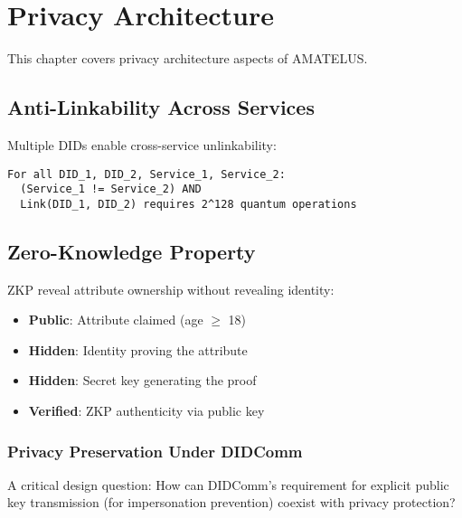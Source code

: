\chapter{Privacy Architecture}


\begin{definition}
  \label{def:priv-chapter}
  This chapter covers privacy architecture aspects of AMATELUS.
  \leanok
\end{definition}
\section{Anti-Linkability Across Services}

Multiple DIDs enable cross-service unlinkability:

\begin{verbatim}
For all DID_1, DID_2, Service_1, Service_2:
  (Service_1 != Service_2) AND
  Link(DID_1, DID_2) requires 2^128 quantum operations
\end{verbatim}

\section{Zero-Knowledge Property}

ZKP reveal attribute ownership without revealing identity:

\begin{itemize}
  \item \textbf{Public}: Attribute claimed (age $\geq$ 18)
  \item \textbf{Hidden}: Identity proving the attribute
  \item \textbf{Hidden}: Secret key generating the proof
  \item \textbf{Verified}: ZKP authenticity via public key
\end{itemize}

\subsection{Privacy Preservation Under DIDComm}

A critical design question: How can DIDComm's requirement for explicit public key transmission
(for impersonation prevention) coexist with privacy protection?

